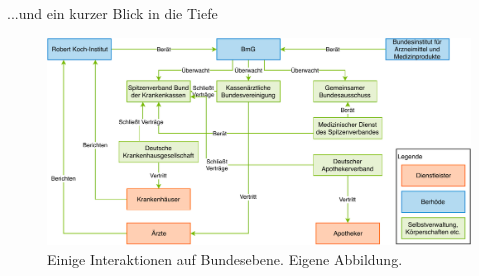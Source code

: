 \documentclass[aspectratio=169,t]{beamer}
\begin{document}
\begin{frame}{...und ein kurzer Blick in die Tiefe}
   \begin{figure}[h!]
    \includegraphics[height=5.5cm, right]{Bilder/GesundheitssystemAkteureBund.pdf}
     \caption{Einige Interaktionen auf Bundesebene. Eigene Abbildung.}
   \end{figure}
\end{frame}
\end{document}
